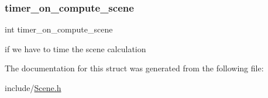 \subsubsection{\texorpdfstring{timer\+\_\+on\+\_\+compute\+\_\+scene}{timer\_on\_compute\_scene}}
{\footnotesize\ttfamily int timer\+\_\+on\+\_\+compute\+\_\+scene}

if we have to time the scene calculation 

The documentation for this struct was generated from the following file\+:\begin{DoxyCompactItemize}
\item 
include/\hyperlink{_scene_8h}{Scene.\+h}\end{DoxyCompactItemize}
